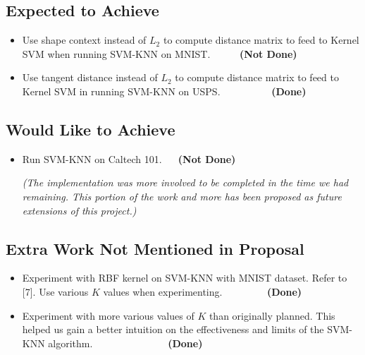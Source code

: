 \documentclass[11pt,letterpaper]{article}
\begin{document}
\subsection{Expected to Achieve}
\begin{itemize}
\item Use shape context instead of $L_2$ to compute distance matrix to feed to Kernel SVM when running SVM-KNN on MNIST. $\>\>\>\>\>\>\>\>\>\>\>\>$\textbf{(Not Done)}

\item Use tangent distance instead of $L_2$ to compute distance matrix to feed to Kernel SVM in running SVM-KNN on USPS. $\>\>\>\>\>\>\>\>\>\>\>\>\>\>\>\>\>\>\>\>\>\>$\textbf{(Done)}
\end{itemize}

\subsection{Would Like to Achieve}
\begin{itemize}
\item Run SVM-KNN on Caltech 101. $\>\>\>\>\>\>$\textbf{(Not Done)}

\textit{(The implementation was more involved to be completed in the time we had remaining. This portion of the work and more has been proposed as future extensions of this project.)}
\end{itemize}

\subsection{Extra Work Not Mentioned in Proposal}

\begin{itemize}
\item Experiment with RBF kernel on SVM-KNN with MNIST dataset. Refer to [7]. Use various $K$ values when experimenting. $\>\>\>\>\>\>\>\>\>\>\>\>\>\>\>\>\>\>\>$\textbf{(Done)}

\item Experiment with more various values of $K$ than originally planned. This helped us gain a better intuition on the effectiveness and limits of the SVM-KNN algorithm. $\>\>\>\>\>\>\>\>\>\>\>\>\>\>\>\>\>\>\>\>\>\>\>\>\>\>\>\>\>\>\>\>\>$\textbf{(Done)}

\end{itemize}
\end{document}
